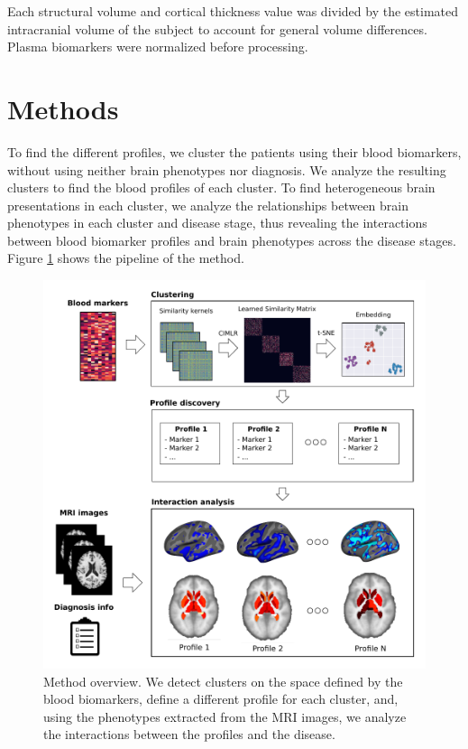 Each structural volume and cortical thickness value was divided by the estimated intracranial volume of the subject to account for general volume differences. Plasma biomarkers were normalized before processing. \\

\section{Methods}
\label{methods}

To find the different profiles, we cluster the patients using their blood biomarkers, without using neither brain phenotypes nor diagnosis. We analyze the resulting clusters to find the blood profiles of each cluster. To find heterogeneous brain presentations in each cluster, we analyze the relationships between brain phenotypes in each cluster and disease stage, thus revealing the interactions between blood biomarker profiles and brain phenotypes across the disease stages. Figure \ref{figmethod} shows the pipeline of the method. \\

\begin{figure}[!htbp]
\centering
 \includegraphics[width=1.0\textwidth]{figures/cimlr/figure_1_new.pdf}
    \caption[Method overview.]{Method overview. We detect clusters on the space defined by the blood biomarkers, define a different profile for each cluster, and, using the phenotypes extracted from the MRI images, we analyze the interactions between the profiles and the disease.}
    \label{figmethod}
\end{figure}

